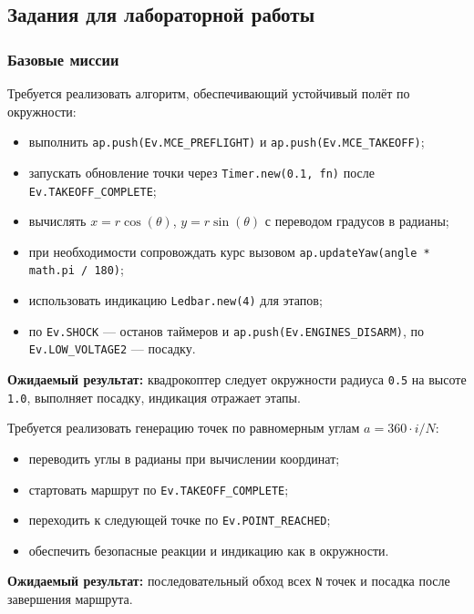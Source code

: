 \subsection{Задания для лабораторной работы}
\subsubsection{Базовые миссии}

\begin{taskbox}[Полёт по окружности радиуса \texttt{r=0.5} на высоте \texttt{z=1.0}]
Требуется реализовать алгоритм, обеспечивающий устойчивый полёт по окружности:
\begin{itemize}
    \item выполнить \texttt{ap.push(Ev.MCE\_PREFLIGHT)} и \texttt{ap.push(Ev.MCE\_TAKEOFF)};
    \item запускать обновление точки через \texttt{Timer.new(0.1, fn)} после \texttt{Ev.TAKEOFF\_COMPLETE};
    \item вычислять \(x = r \cos(\theta)\), \(y = r \sin(\theta)\) с переводом градусов в радианы;
    \item при необходимости сопровождать курс вызовом \texttt{ap.updateYaw(angle * math.pi / 180)};
    \item использовать индикацию \texttt{Ledbar.new(4)} для этапов;
    \item по \texttt{Ev.SHOCK} — останов таймеров и \texttt{ap.push(Ev.ENGINES\_DISARM)}, по \texttt{Ev.LOW\_VOLTAGE2} — посадку.
\end{itemize}

\textbf{Ожидаемый результат:} квадрокоптер следует окружности радиуса \texttt{0.5} на высоте \texttt{1.0}, выполняет посадку, индикация отражает этапы.
\end{taskbox}

\begin{taskbox}
Требуется реализовать генерацию точек по равномерным углам \(a = 360 \cdot i / N\):
\begin{itemize}
    \item переводить углы в радианы при вычислении координат;
    \item стартовать маршрут по \texttt{Ev.TAKEOFF\_COMPLETE};
    \item переходить к следующей точке по \texttt{Ev.POINT\_REACHED};
    \item обеспечить безопасные реакции и индикацию как в окружности.
\end{itemize}

\textbf{Ожидаемый результат:} последовательный обход всех \texttt{N} точек и посадка после завершения маршрута.
\end{taskbox}

